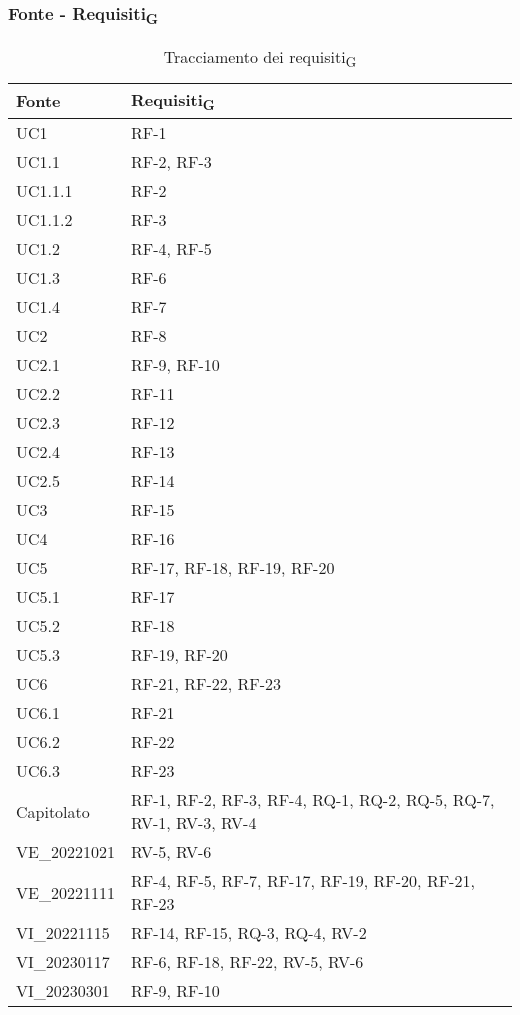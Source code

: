 \subsubsection{Fonte - Requisiti\textsubscript{G}}
\begin{table}[H]
	\centering
	\begin{tabular}{| p{} | p{} |} 
 \hline
 \textbf{Fonte} & \textbf{Requisiti\textsubscript{G}} \\
 \hline
	UC1 & RF-1\\
	\hline
	UC1.1 & RF-2, RF-3\\
    \hline
	UC1.1.1 & RF-2\\
    \hline
	UC1.1.2 & RF-3\\
	\hline
	UC1.2 & RF-4, RF-5\\
	\hline
	UC1.3 & RF-6\\
	\hline
	UC1.4 & RF-7\\
	\hline
	UC2 & RF-8\\
 	\hline
	UC2.1 & RF-9, RF-10\\
 	\hline
	UC2.2 & RF-11\\
  	\hline
	UC2.3 & RF-12\\
  	\hline
	UC2.4 & RF-13\\
  	\hline
	UC2.5 & RF-14\\
	\hline
	UC3 & RF-15\\ 
	\hline
	UC4 & RF-16\\
 	\hline
	UC5 & RF-17, RF-18, RF-19, RF-20\\
 \hline
	UC5.1 & RF-17\\
 \hline
	UC5.2 & RF-18\\
 \hline
	UC5.3 & RF-19, RF-20\\
 	\hline
	UC6 & RF-21, RF-22, RF-23\\
 \hline
	UC6.1 & RF-21\\
 \hline
	UC6.2 & RF-22\\
 \hline
	UC6.3 & RF-23\\
	\hline
	Capitolato & RF-1, RF-2, RF-3, RF-4, RQ-1, RQ-2, RQ-5, RQ-7, RV-1, RV-3, RV-4\\
 	\hline
	VE\_20221021 & RV-5, RV-6\\
	\hline
	VE\_20221111 & RF-4, RF-5, RF-7, RF-17, RF-19, RF-20, RF-21, RF-23\\
	\hline
	VI\_20221115 & RF-14, RF-15, RQ-3, RQ-4, RV-2\\
    \hline
	VI\_20230117 & RF-6, RF-18, RF-22, RV-5, RV-6\\
 \hline
	VI\_20230301 & RF-9, RF-10\\
	\hline
	\end{tabular}
	\caption{Tracciamento dei requisiti\textsubscript{G}}
\end{table}

